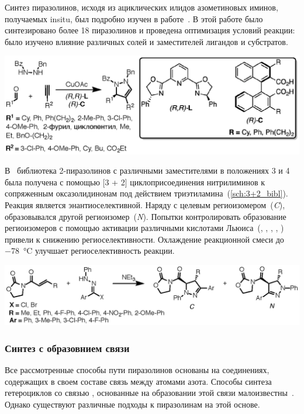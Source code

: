 Синтез пиразолинов, исходя из ациклических илидов азометиновых иминов, получаемых \ac{insitu}, был подробно изучен в работе~\cite{Hashimoto2013}.
В этой работе было синтезировано более \num{18} пиразолинов и проведена оптимизация условий реакции: было изучено влияние различных солей  и заместителей лигандов и субстратов.

\begin{scheme}[h!]
    \centering
    \includegraphics{sections/literature/img/cycloaddition_example.eps}
    \caption{}
    \label{sch:cycloaddition_example}
\end{scheme}

В~\cite{Manyem2007} библиотека 2-пиразолинов с различными заместителями в положениях 3 и 4 была получена с помощью [3 + 2] циклоприсоединения нитрилиминов к сопряженным оксазолидинонам под действием триэтиламина~(\ref{sch:3+2_bibl}).
Реакция является энантиоселективной. Наряду с целевым региоизомером~(\emph{C}), образовывался другой региоизомер~(\emph{N}).
Попытки контролировать образование региоизомеров с помощью активации различными кислотами Льюиса~(, , , , ) привели к снижению региоселективности.
Охлаждение реакционной смеси до \SI{-78}{\celsius} улучшает региоселективность реакции.

\begin{scheme}[h!]
    \centering
    \includegraphics{sections/literature/img/3+2_bibl.eps}
    \caption{}
    \label{sch:3+2_bibl}
\end{scheme}
\FloatBarrier{}

\subsubsection{Синтез с образовнием связи }
Все рассмотренные способы пути пиразолинов основаны на соединениях, содержащих в своем составе связь между атомами азота.
Способы синтеза гетероциклов со связью , основанные на образовании этой связи малоизвестны~\cite{Guo2017}.
Однако существуют различные подходы к пиразолинам на этой основе.

